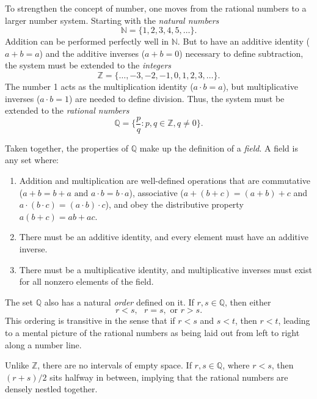 \documentclass{article}
\begin{document}
    To strengthen the concept of number, one moves from the rational numbers to a larger number system. Starting with the \textit{natural numbers}
    \begin{equation*}
        \mathbb{N} = \{1,2,3,4,5,\dots\}.
    \end{equation*}
    Addition can be performed perfectly well in $\mathbb{N}$. But to have an additive identity ($a+b=a$) and the additive inverses ($a+b=0$) necessary to define subtraction, the system must be extended to the \textit{integers}
    \begin{equation*}
        \mathbb{Z} = \{\dots, -3, -2, -1, 0, 1, 2, 3, \dots\}.
    \end{equation*}
    The number 1 acts as the multiplication identity ($a \cdot b = a$), but multiplicative inverses ($a \cdot b=1$) are needed to define division. Thus, the system must be extended to the \textit{rational numbers}
    \begin{equation*}
        \mathbb{Q} = \bigg\{ \frac{p}{q}: p,q \in \mathbb{Z}, q \neq 0 \bigg\}.
    \end{equation*}
    
    Taken together, the properties of $\mathbb{Q}$ make up the definition of a \textit{field}. A field is any set where:
    \begin{enumerate}
        \item Addition and multiplication are well-defined operations that are commutative ($a+b=b+a \text{ and }a \cdot b = b \cdot a$), associative ($a+(b+c)=(a+b)+c$ and $a\cdot (b \cdot c) = (a \cdot b) \cdot c$), and obey the distributive property $a(b+c) = ab+ac$. 
        \item There must be an additive identity, and every element must have an additive inverse.
        \item There must be a multiplicative identity, and multiplicative inverses must exist for all nonzero elements of the field.
    \end{enumerate}
    The set $\mathbb{Q}$ also has a natural \textit{order} defined on it. If $r,s \in \mathbb{Q}$, then either
    \begin{equation*}
        r < s, \text{ } r=s, \text{ or } r > s.
    \end{equation*}
    This ordering is transitive in the sense that if $r < s$ and $s < t$, then $r < t$, leading to a mental picture of the rational numbers as being laid out from left to right along a number line. 
    
    Unlike $\mathbb{Z}$, there are no intervals of empty space. If $r, s \in \mathbb{Q}$, where $r < s$, then $(r+s)/2$ sits halfway in between, implying that the rational numbers are densely nestled together.
    
\end{document}
